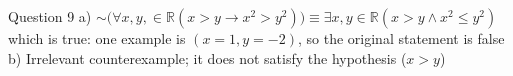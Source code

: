\documentclass[10pt]{beamer}
\begin{document}
\begin{frame}[fragile]{Question 9}
a) $\sim \Big(\forall x, y, \in \mathbb{R} ( x > y \rightarrow x^2 > y ^ 2) \Big) \equiv \exists x, y \in \mathbb{R} (x > y \land x^2 \leq y^2)$ which is true: one example is $(x=1, y = -2)$, so the original statement is false \\
\bigskip
b) Irrelevant counterexample; it does not satisfy the hypothesis ($x > y$)
\end{frame}
\end{document}
